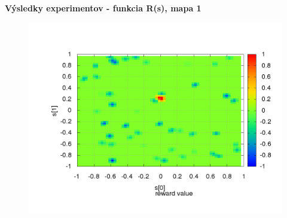 \documentclass[xcolor=dvipsnames]{beamer}
\begin{document}
\begin{frame}{\bf Výsledky experimentov - funkcia R(s), mapa 1}

\begin{figure}[!htb]
\centering
\includegraphics[scale=.4]{../../results_q_learning/map_1/reward_value_surface.png}
\end{figure}

\end{frame}
\end{document}
